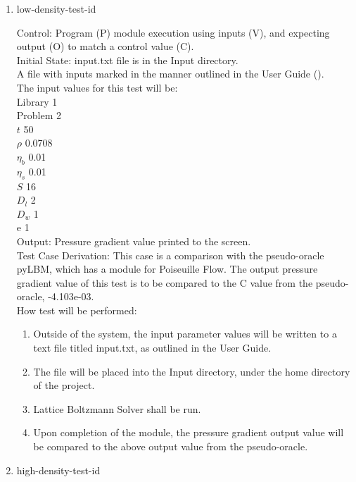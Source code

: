\documentclass[12pt, titlepage]{article}
\newcommand{\famname}{Lattice Boltzmann Solver}
\newcounter{testcounter} %
\begin{document}
\begin{enumerate}
\item{low-density-test-id\thetestcounter \\}

Control: Program (P) module execution using inputs (V), and expecting output (O) to match a control value (C).\\
					
Initial State: input.txt file is in the Input directory.\\
					
A file with inputs marked in the manner outlined in the User
Guide (\citet{LBM_UserGuide_PM}).\\The input values for this test will be:\\
Library 1\\
Problem 2\\
$t$ 50\\
$\rho$ 0.0708\\
$\eta_b$ 0.01\\
$\eta_s$ 0.01\\
$S$ 16\\
$D_{l}$ 2\\
$D_{w}$ 1\\
$\mathrm{e}$ 1\\

					
Output: Pressure gradient value printed to the screen. \\ 

Test Case Derivation: This case is a comparison with the pseudo-oracle pyLBM,
which has a module for Poiseuille Flow. The output pressure gradient value of
this test is to be compared to the C value from the pseudo-oracle,
-4.103e-03.\\
					
How test will be performed: 

\begin{enumerate}
\item Outside of the system, the input parameter values will be written to a text file titled input.txt, as outlined in the User Guide.
\item The file will be placed into the Input directory, under the home directory
of the project.
\item {\famname} shall be run.
\item Upon completion of the module, the pressure gradient output value will be
compared to the above output value from the pseudo-oracle.
\end{enumerate}	

\item{high-density-test-id\thetestcounter \\}


\end{enumerate}
\end{document}
